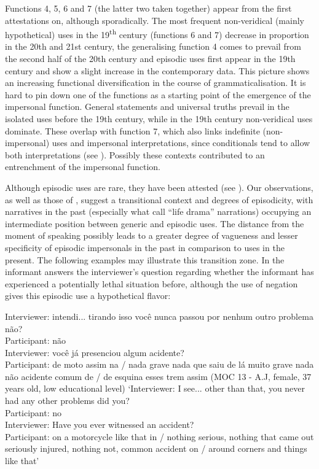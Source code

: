 \documentclass[output=paper]{langscibook}
\begin{document}
Functions 4, 5, 6 and 7 (the latter two taken together) appear from the first attestations on, although sporadically. The most frequent non-veridical (mainly hypothetical) uses in the 19\textsuperscript{th} century (functions 6 and 7) decrease in proportion in the 20th and 21st century, the generalising function 4 comes to prevail from the second half of the 20th century and episodic uses first appear in the 19th century and show a slight increase in the contemporary data. This picture shows an increasing functional diversification in the course of grammaticalisation. It is hard to pin down one of the functions as a starting point of the emergence of the impersonal function. General statements and universal truths prevail in the isolated uses before the 19th century, while in the 19th century non-veridical uses dominate. These overlap with function 7, which also links indefinite (non-impersonal) uses and impersonal interpretations, since conditionals tend to allow both interpretations (see ). Possibly these contexts contributed to an entrenchment of the impersonal function.



Although episodic uses are rare, they have been attested (see \citealt{AmaralMihatsch2019}). Our observations, as well as those of \citet{Posio2021}, suggest a transitional context and degrees of episodicity, with narratives in the past (especially what \citet{KitagawaLehrer1990} call “life drama” narrations) occupying an intermediate position between generic and episodic uses. The distance from the moment of speaking possibly leads to a greater degree of vagueness and lesser specificity of episodic impersonals in the past in comparison to uses in the present. The following examples may illustrate this transition zone. In  the informant answers the interviewer’s question regarding whether the informant has experienced a potentially lethal situation before, although the use of negation gives this episodic use a hypothetical flavor:\largerpage



\ea\label{ex:amaral:38} 
{Interviewer:} {{intendi... tirando isso você nunca passou por nenhum outro problema não?}}\\
{Participant:} {{não}}\\
{Interviewer:} {{você já presenciou algum acidente?}}\\
{Participant:} de moto assim na / nada grave nada que  saiu de lá muito grave nada não acidente comum de / de esquina esses trem assim
(MOC 13 - A.J, female, 37 years old, low educational level)
\glt
`{Interviewer:} {I see... other than that, you never had any other problems did you?}\\
{Participant:} {no}\\
{Interviewer}{: Have you ever witnessed an accident?}\\
{Participant}{: on a motorcycle like that in / nothing serious, nothing that} { } {came out seriously injured, nothing not, common accident on / around corners and things like that’}
\z 
\end{document}
